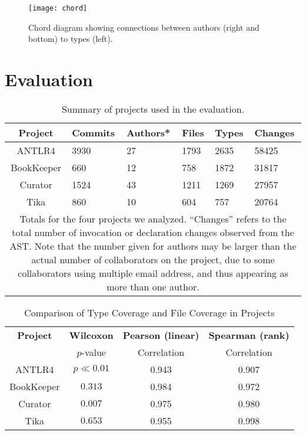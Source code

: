 \begin{figure*}[p]
\centering
\texttt{[image: chord]}
\caption{Chord diagram showing connections between authors (right and bottom) to types (left).}
\label{fig:chord}
\end{figure*}

\section{Evaluation}

\begin{table}[t]
\renewcommand{\arraystretch}{1.3}
\centering
\caption{Summary of projects used in the evaluation.}
\label{tab:project-summary}
\begin{tabular}{c|lllll}
\hline
\bfseries Project & \bfseries Commits & \bfseries Authors* & \bfseries Files &   \bfseries Types &  \bfseries  Changes\\
\hline
ANTLR4 & 3930 & 27 & 1793 & 2635 & 58425\\
BookKeeper & 660 & 12 & 758 & 1872 & 31817\\
Curator & 1524 & 43 & 1211 & 1269 & 27957\\
Tika & 860 & 10 & 604 & 757 & 20764\\
\hline
\multicolumn{6}{p{\linewidth}}{\footnotesize Totals for the four projects we analyzed. ``Changes'' refers to the total number of invocation or declaration changes observed from the AST. Note that the number given for authors may be larger than the actual number of collaborators on the project, due to some collaborators using multiple email address, and thus appearing as more than one author.}
\end{tabular}
\end{table}

\begin{table}[ht]
\renewcommand{\arraystretch}{1.3}
\caption{Comparison of Type Coverage and File Coverage in Projects}
\label{tab:summary}
\centering
\begin{tabular}{c|ccc}
\hline
\bfseries Project & \bfseries Wilcoxon& \bfseries Pearson (linear) & \bfseries Spearman (rank) \\
& $p$-value & Correlation & Correlation \\
\hline
ANTLR4 & $p\ll0.01$ & 0.943 & 0.907\\
BookKeeper & $0.313$ & 0.984 & 0.972\\
Curator & $0.007$ & 0.975 & 0.980\\
Tika & $0.653$ & 0.955 & 0.998\\
\hline
\end{tabular}
\end{table}

